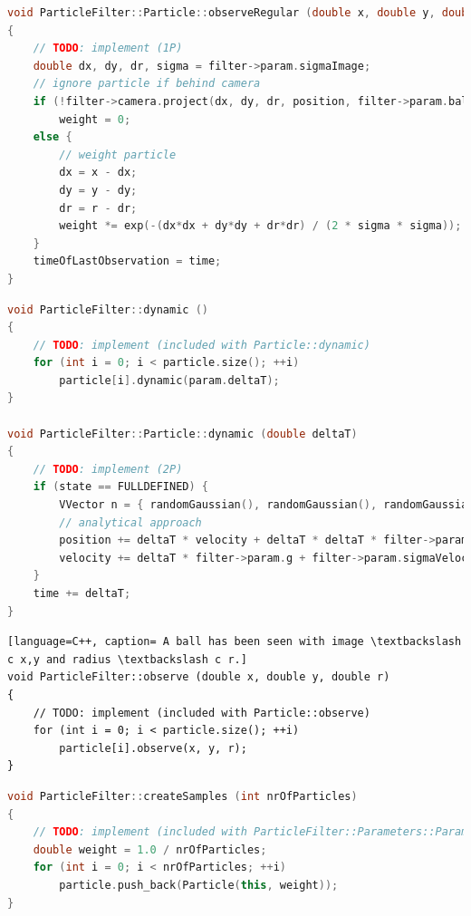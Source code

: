 \documentclass{ezb}
\begin{document}
\begin{lstlisting}[language=C++, caption=Integrate an observation of the ball once the particle is fully initialized]
void ParticleFilter::Particle::observeRegular (double x, double y, double r)
{
	// TODO: implement (1P)
	double dx, dy, dr, sigma = filter->param.sigmaImage;
	// ignore particle if behind camera
	if (!filter->camera.project(dx, dy, dr, position, filter->param.ballRadius)) 
		weight = 0;
	else {
		// weight particle
		dx = x - dx;
		dy = y - dy;
		dr = r - dr;
		weight *= exp(-(dx*dx + dy*dy + dr*dr) / (2 * sigma * sigma));
	}
	timeOfLastObservation = time;
}
\end{lstlisting}

\begin{lstlisting}[language=C++, caption= Time \textbackslash c deltaT has passed. Proceed to the next image and update the particles accordingly.]
void ParticleFilter::dynamic ()
{
	// TODO: implement (included with Particle::dynamic)
	for (int i = 0; i < particle.size(); ++i)
		particle[i].dynamic(param.deltaT);
}

void ParticleFilter::Particle::dynamic (double deltaT)
{
	// TODO: implement (2P)
	if (state == FULLDEFINED) {
		VVector n = { randomGaussian(), randomGaussian(), randomGaussian(), 0};
		// analytical approach
		position += deltaT * velocity + deltaT * deltaT * filter->param.g * .5;
		velocity += deltaT * filter->param.g + filter->param.sigmaVelocity * sqrt(deltaT) * n;
	}
	time += deltaT;
}
\end{lstlisting}

\begin{lstlisting}[language=C++, caption= A ball has been seen with image \textbackslash c x,y and radius \textbackslash c r.]
void ParticleFilter::observe (double x, double y, double r)
{
	// TODO: implement (included with Particle::observe)
	for (int i = 0; i < particle.size(); ++i)
		particle[i].observe(x, y, r);
}
\end{lstlisting}

\begin{lstlisting}[language=C++, caption=Initialize the particle filter with \textbackslash c nrOfParticles particles]
void ParticleFilter::createSamples (int nrOfParticles)
{
	// TODO: implement (included with ParticleFilter::Parameters::Parameters)
	double weight = 1.0 / nrOfParticles;
	for (int i = 0; i < nrOfParticles; ++i)
		particle.push_back(Particle(this, weight));
}
\end{lstlisting}
\end{document}
